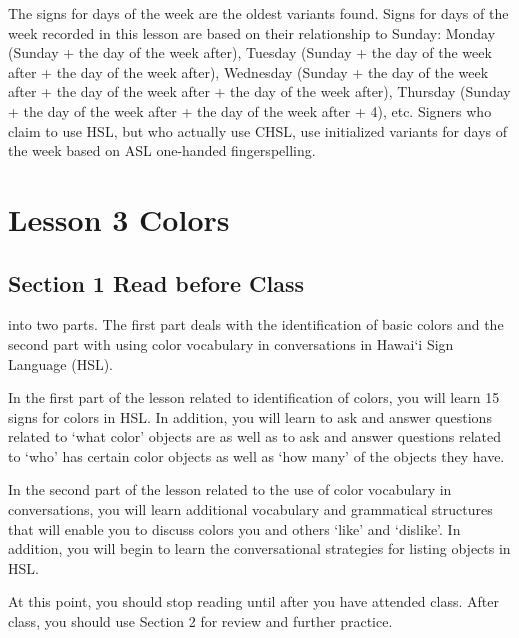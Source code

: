 \documentclass{tufte-book}
\begin{document}
The signs for days of the week are the oldest variants found. Signs for days of the week recorded in this lesson are based on their relationship to Sunday: Monday (Sunday + the day of the week after), Tuesday (Sunday + the day of the week after + the day of the week after), Wednesday (Sunday + the day of the week after + the day of the week after + the day of the week after), Thursday (Sunday + the day of the week after + the day of the week after + 4), etc. Signers who claim to use HSL, but who actually use CHSL, use initialized variants for days of the week based on ASL one-handed fingerspelling.








\chapter{Lesson 3 Colors}

\section{Section 1 Read before Class}
 into two parts. The first part deals with the identification
of basic colors and the second part with using color vocabulary in conversations in
Hawai`i Sign Language (HSL).

In the first part of the lesson related to identification of colors, you will learn 15
signs for colors in HSL. In addition, you will learn to ask and answer
questions related to `what color' objects are as well as to ask and answer questions
related to `who' has certain color objects as well as `how many' of the objects they
have.

In the second part of the lesson related to the use of color vocabulary in
conversations, you will learn additional vocabulary and grammatical structures that
will enable you to discuss colors you and others `like' and `dislike'. In addition, you will begin to learn the conversational
strategies for listing objects in HSL.

At this point, you should stop reading until after you have attended class.
After class, you should use Section 2 for review and further practice.
\end{document}
